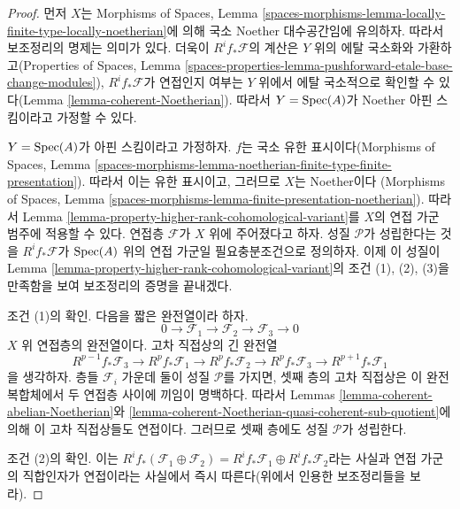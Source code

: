 \begin{proof}
먼저 $X$는 Morphisms of Spaces, Lemma
\ref{spaces-morphisms-lemma-locally-finite-type-locally-noetherian}에
의해 국소 Noether 대수공간임에 유의하자. 따라서 보조정리의 명제는
의미가 있다. 더욱이 $R^if_*\mathcal{F}$의 계산은 $Y$ 위의 에탈
국소화와 가환하고(Properties of Spaces, Lemma
\ref{spaces-properties-lemma-pushforward-etale-base-change-modules}),
$R^if_*\mathcal{F}$가 연접인지 여부는 $Y$ 위에서 에탈 국소적으로
확인할 수 있다(Lemma \ref{lemma-coherent-Noetherian}). 따라서
$Y = \mathop{\mathrm{Spec}}(A)$가 Noether 아핀 스킴이라고 가정할 수 있다.

\medskip\noindent
$Y = \mathop{\mathrm{Spec}}(A)$가 아핀 스킴이라고 가정하자. $f$는 국소 유한
표시이다(Morphisms of Spaces, Lemma
\ref{spaces-morphisms-lemma-noetherian-finite-type-finite-presentation}).
따라서 이는 유한 표시이고, 그러므로 $X$는 Noether이다
(Morphisms of Spaces, Lemma
\ref{spaces-morphisms-lemma-finite-presentation-noetherian}).
따라서 Lemma \ref{lemma-property-higher-rank-cohomological-variant}를
$X$의 연접 가군 범주에 적용할 수 있다. 연접층 $\mathcal{F}$가 $X$
위에 주어졌다고 하자. 성질 $\mathcal{P}$가 성립한다는 것을
$R^if_*\mathcal{F}$가 $\mathop{\mathrm{Spec}}(A)$ 위의 연접 가군일 필요충분조건으로
정의하자.
이제 이 성질이 Lemma
\ref{lemma-property-higher-rank-cohomological-variant}의 조건 (1),
(2), (3)을 만족함을 보여 보조정리의 증명을 끝내겠다.

\medskip\noindent
조건 (1)의 확인. 다음을 짧은 완전열이라 하자.
$$
0 \to \mathcal{F}_1 \to \mathcal{F}_2 \to \mathcal{F}_3 \to 0
$$
$X$ 위 연접층의 완전열이다.
고차 직접상의 긴 완전열
$$
R^{p - 1}f_*\mathcal{F}_3 \to
R^pf_*\mathcal{F}_1 \to
R^pf_*\mathcal{F}_2 \to
R^pf_*\mathcal{F}_3 \to
R^{p + 1}f_*\mathcal{F}_1
$$
을 생각하자. 층들 $\mathcal{F}_i$ 가운데 둘이 성질 $\mathcal{P}$를
가지면, 셋째 층의 고차 직접상은 이 완전 복합체에서 두 연접층 사이에
끼임이 명백하다. 따라서 Lemmas
\ref{lemma-coherent-abelian-Noetherian}와
\ref{lemma-coherent-Noetherian-quasi-coherent-sub-quotient}에 의해
이 고차 직접상들도 연접이다. 그러므로 셋째 층에도 성질
$\mathcal{P}$가 성립한다.

\medskip\noindent
조건 (2)의 확인. 이는
$R^if_*(\mathcal{F}_1 \oplus \mathcal{F}_2) =
R^if_*\mathcal{F}_1 \oplus R^if_*\mathcal{F}_2$라는 사실과 연접
가군의 직합인자가 연접이라는 사실에서 즉시 따른다(위에서 인용한
보조정리들을 보라).


\end{proof}
